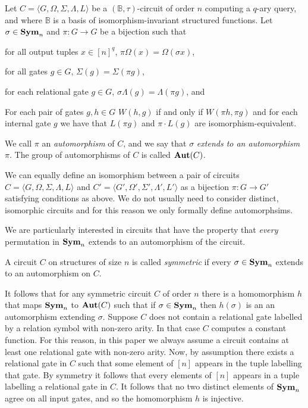 \documentclass[../paper.tex]{subfiles}
\begin{document}
\begin{definition}[Automorphism]\label{defn:automorphism}
  Let $C = \langle G, \Omega, \Sigma, \Lambda, L\rangle$ be a
  $(\mathbb{B},\tau)$-circuit of order $n$ computing a $q$-ary query, and where
  $\mathbb{B}$ is a basis of isomorphism-invariant structured functions. Let
  $\sigma \in \text{\textbf{Sym}}_n$ and $\pi: G \rightarrow G$ be a bijection such that
  \begin{myitemize}
  \item for all output tuples $x \in [n]^q$, $\pi \Omega (x) = \Omega (\sigma
    x)$,
  \item for all gates $g \in G$, $\Sigma (g) = \Sigma (\pi g)$,
  \item for each relational gate $g \in G$, $\sigma \Lambda (g) = \Lambda (\pi
    g)$, and
  \item For each pair of gates $g, h \in G$ $W(h,g)$ if and only if $W(\pi h,
    \pi g)$ and for each internal gate $g$ we have that $L(\pi g)$ and $ \pi
    \cdot L(g)$ are isomorphism-equivalent.
  \end{myitemize}
  We call $\pi$ an \emph{automorphism} of $C$, and we say that $\sigma$
  \emph{extends to an automorphism} $\pi$. The group of automorphisms of $C$ is
  called $\text{\textbf{Aut}} (C)$.
\end{definition}
We can equally define an isomorphism between a pair of circuits $C =
\langle G, \Omega, \Sigma, \Lambda, L\rangle$ and  $C' = \langle G',
\Omega', \Sigma', \Lambda', L'\rangle$ as a bijection $\pi: G
\rightarrow G'$ satisfying conditions as above.  We do not usually
need to consider distinct, isomorphic circuits and for this reason we
only formally define automorphsims.

We are particularly interested in circuits that have the property that
\emph{every} permutation in $\text{\textbf{Sym}}_n$ extends to an automorphism of the circuit.

\begin{definition}[Symmetry]
  A circuit $C$ on structures of size $n$ is called \emph{symmetric} if every
  $\sigma \in \text{\textbf{Sym}}_n$ extends to an automorphism on $C$.
\end{definition}

It follows that for any symmetric circuit $C$ of order $n$ there is a
homomorphism $h$ that maps $\text{\textbf{Sym}}_n$ to $\text{\textbf{Aut}}(C)$ such that if $\sigma \in
\text{\textbf{Sym}}_n$ then $h(\sigma)$ is an an automorphism extending $\sigma$. Suppose $C$
does not contain a relational gate labelled by a relation symbol with non-zero
arity. In that case $C$ computes a constant function. For this reason, in this
paper we always assume a circuit contains at least one relational gate with
non-zero arity. Now, by assumption there exists a relational gate in $C$ such
that some element of $[n]$ appears in the tuple labelling that gate. By symmetry
it follows that every elements of $[n]$ appears in a tuple labelling a
relational gate in $C$. It follows that no two distinct elements of $\text{\textbf{Sym}}_n$
agree on all input gates, and so the homomorphism $h$ is injective.
\end{document}
